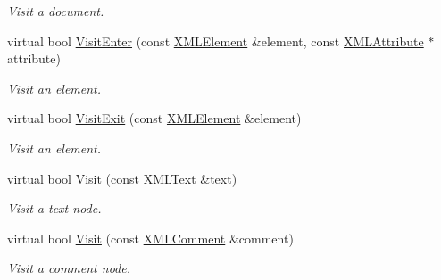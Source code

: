 \begin{DoxyCompactItemize}
\begin{DoxyCompactList}\small\item\em Visit a document. \end{DoxyCompactList}\item 
\mbox{\label{classtinyxml2_1_1XMLPrinter_a169b2509d8eabb70811b2bb8cfd1f5d1}} 
virtual bool \hyperlink{classtinyxml2_1_1XMLPrinter_a169b2509d8eabb70811b2bb8cfd1f5d1}{Visit\+Enter} (const \hyperlink{classtinyxml2_1_1XMLElement}{X\+M\+L\+Element} \&element, const \hyperlink{classtinyxml2_1_1XMLAttribute}{X\+M\+L\+Attribute} $\ast$attribute)
\begin{DoxyCompactList}\small\item\em Visit an element. \end{DoxyCompactList}\item 
\mbox{\label{classtinyxml2_1_1XMLPrinter_a2edd48405971a88951c71c9df86a2f50}} 
virtual bool \hyperlink{classtinyxml2_1_1XMLPrinter_a2edd48405971a88951c71c9df86a2f50}{Visit\+Exit} (const \hyperlink{classtinyxml2_1_1XMLElement}{X\+M\+L\+Element} \&element)
\begin{DoxyCompactList}\small\item\em Visit an element. \end{DoxyCompactList}\item 
\mbox{\label{classtinyxml2_1_1XMLPrinter_adc0e42b4f6fcb90a95630c79575d030b}} 
virtual bool \hyperlink{classtinyxml2_1_1XMLPrinter_adc0e42b4f6fcb90a95630c79575d030b}{Visit} (const \hyperlink{classtinyxml2_1_1XMLText}{X\+M\+L\+Text} \&text)
\begin{DoxyCompactList}\small\item\em Visit a text node. \end{DoxyCompactList}\item 
\mbox{\label{classtinyxml2_1_1XMLPrinter_aa294c5c01af0ebb9114902456e4cb53c}} 
virtual bool \hyperlink{classtinyxml2_1_1XMLPrinter_aa294c5c01af0ebb9114902456e4cb53c}{Visit} (const \hyperlink{classtinyxml2_1_1XMLComment}{X\+M\+L\+Comment} \&comment)
\begin{DoxyCompactList}\small\item\em Visit a comment node. \end{DoxyCompactList}\item 

\end{DoxyCompactItemize}
